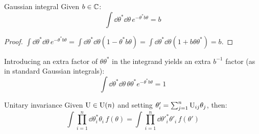 \begin{lemma}{Gaussian integral}{}
  Given $ b \in \mathbb{C} $:
  \begin{equation}
    \int \dd \theta^* \dd \theta\, e^{- \theta^* b \theta} = b
  \end{equation}
\end{lemma}

\begin{proofbox}
  \begin{proof}
    $ \int \dd \theta^* \dd \theta\, e^{-\theta^* b \theta} = \int \dd \theta^* \dd \theta \left( 1 - \theta^* b \theta \right) = \int \dd \theta^* \dd \theta \left( 1 + b \theta \theta^* \right) = b $.
  \end{proof}
\end{proofbox}

Introducing an extra factor of $ \theta \theta^* $ in the integrand yields an extra $ b^{-1} $ factor (as in standard Gaussian integrals):
\begin{equation}
  \int \dd \theta^* \dd \theta\, \theta \theta^* e^{-\theta^* b \theta} = 1
\end{equation}

\begin{proposition}{Unitary invariance}{}
  Given $ \mathrm{U} \in \mathrm{U}(n) $ and setting $ \theta'_i = \sum_{j = 1}^n \mathrm{U}_{ij} \theta_j $, then:
  \begin{equation}
    \int \prod_{i = 1}^n \dd \theta^*_i \theta_i\, f(\theta) = \int \prod_{i = 1}^n \dd {\theta'}^*_i \theta'_i\, f(\theta')
  \end{equation}
\end{proposition}

